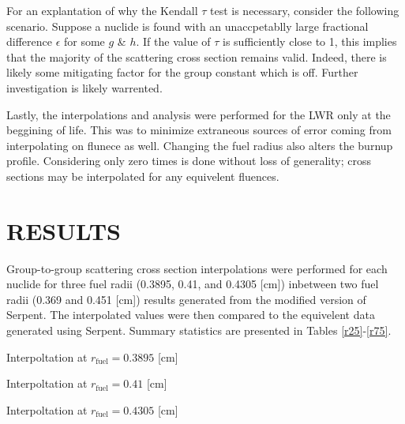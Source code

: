 \documentclass{physor2012}
\begin{document}
For an explantation of why the Kendall $\tau$ test is necessary, consider the following
scenario.  Suppose a nuclide is found with an unaccpetablly large fractional 
difference $\epsilon$ for some $g$ \& $h$.  If the value of $\tau$ is sufficiently
close to 1, this implies that the majority of the scattering cross section 
remains valid.  Indeed, there is likely some mitigating factor for the 
group constant which is off.  Further investigation is likely warrented.

Lastly, the interpolations and analysis were performed for the LWR only
at the beggining of life.  This was to minimize extraneous sources of error
coming from interpolating on flunece as well.  Changing the fuel radius also 
alters the burnup profile.  Considering only zero times is done without
loss of generality; cross sections may be interpolated for any equivelent 
fluences.

\section{RESULTS} 
\label{sec:results}

Group-to-group scattering cross section interpolations were performed for
each nuclide for three fuel radii (0.3895, 0.41, and 0.4305 [cm]) inbetween two 
fuel radii (0.369 and 0.451 [cm]) results generated from the modified version of
Serpent.  The interpolated values were then compared to the equivelent data 
generated using Serpent.  Summary statistics are presented in 
Tables \ref{r25}-\ref{r75}.

\begin{table}[htbp]
\begin{center}
\caption{Interpoltation at $r_{\mbox{fuel}}=0.3895$ [cm]}
\label{r25}

\end{center}
\end{table}

\begin{table}[htbp]
\begin{center}
\caption{Interpoltation at $r_{\mbox{fuel}}=0.41$ [cm]}
\label{r50}

\end{center}
\end{table}

\begin{table}[htbp]
\begin{center}
\caption{Interpoltation at $r_{\mbox{fuel}}=0.4305$ [cm]}
\label{r75}

\end{center}
\end{table}
\end{document}
